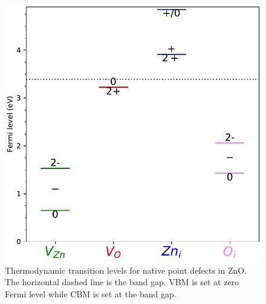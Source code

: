 \begin{figure}[tbh!]
	\centering
	\includegraphics[width=0.45\linewidth]{"images/rnd/trans_lvl"}
	\caption[Thermodynamic transition levels for native point defects in ZnO]{Thermodynamic transition levels for native point defects in ZnO. The horizontal dashed line is the band gap. VBM is set at zero Fermi level while CBM is set at the band gap.}
	\label{fig:transition_level}
\end{figure}

